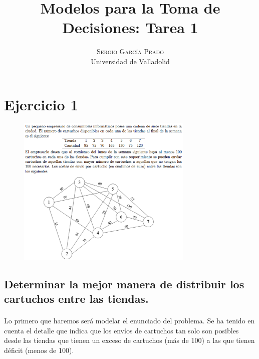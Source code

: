 \documentclass[10pt, a4paper]{article}
\title{\vspace{-15mm}\fontsize{24pt}{10pt}\selectfont\textbf{Modelos para la Toma de Decisiones: Tarea 1}} %
\author{
\large
\textsc{Sergio García Prado}\\[2mm] %
\normalsize Universidad de Valladolid \\ %
\vspace{-5mm}
}
\date{}
\begin{document}
	\maketitle %

	\thispagestyle{fancy} %


    \section{Ejercicio 1}

        \begin{figure}[H]
        \centering
            \includegraphics[width=0.75\textwidth]{res/Exercise_1.png}
        \end{figure}

		\subsection{Determinar la mejor manera de distribuir los cartuchos entre las tiendas.}

			\paragraph{}
			Lo primero que haremos será modelar el enunciado del problema. Se ha tenido en cuenta el detalle que indica que los envíos de cartuchos tan solo son posibles desde las tiendas que tienen un exceso de cartuchos (más de 100) a las que tienen déficit (menos de 100).
\end{document}
